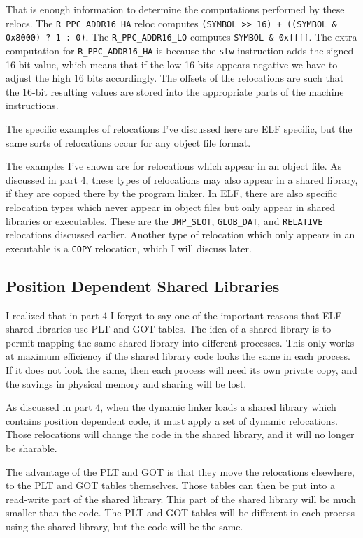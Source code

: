 That is enough information to determine the computations performed by these
relocs. The \texttt{R\_PPC\_ADDR16\_HA} reloc computes \texttt{(SYMBOL >>
16) + ((SYMBOL \& 0x8000) ? 1 : 0)}. The \texttt{R\_PPC\_ADDR16\_LO} computes
\texttt{SYMBOL \& 0xffff}. The extra computation for \texttt{R\_PPC\_ADDR16\_HA}
is because the \texttt{stw} instruction adds the signed 16-bit value,
which means that if the low 16 bits appears negative we have to adjust the
high 16 bits accordingly. The offsets of the relocations are such that the
16-bit resulting values are stored into the appropriate parts of the machine
instructions.

The specific examples of relocations I've discussed here are ELF specific, but
the same sorts of relocations occur for any object file format.

The examples I've shown are for relocations which appear in an object
file. As discussed in part 4, these types of relocations may also appear
in a shared library, if they are copied there by the program linker. In
ELF, there are also specific relocation types which never appear in object
files but only appear in shared libraries or executables. These are the
\texttt{JMP\_SLOT}, \texttt{GLOB\_DAT}, and \texttt{RELATIVE} relocations
discussed earlier. Another type of relocation which only appears in an
executable is a \texttt{COPY} relocation, which I will discuss later.

\subsection{Position Dependent Shared Libraries}

I realized that in part 4 I forgot to say one of the important reasons that
ELF shared libraries use PLT and GOT tables. The idea of a shared library is
to permit mapping the same shared library into different processes. This only
works at maximum efficiency if the shared library code looks the same in each
process. If it does not look the same, then each process will need its own
private copy, and the savings in physical memory and sharing will be lost.

As discussed in part 4, when the dynamic linker loads a shared library which
contains position dependent code, it must apply a set of dynamic relocations.
Those relocations will change the code in the shared library, and it will no
longer be sharable.

The advantage of the PLT and GOT is that they move the relocations elsewhere,
to the PLT and GOT tables themselves. Those tables can then be put into a
read-write part of the shared library. This part of the shared library will be
much smaller than the code. The PLT and GOT tables will be different in each
process using the shared library, but the code will be the same.
